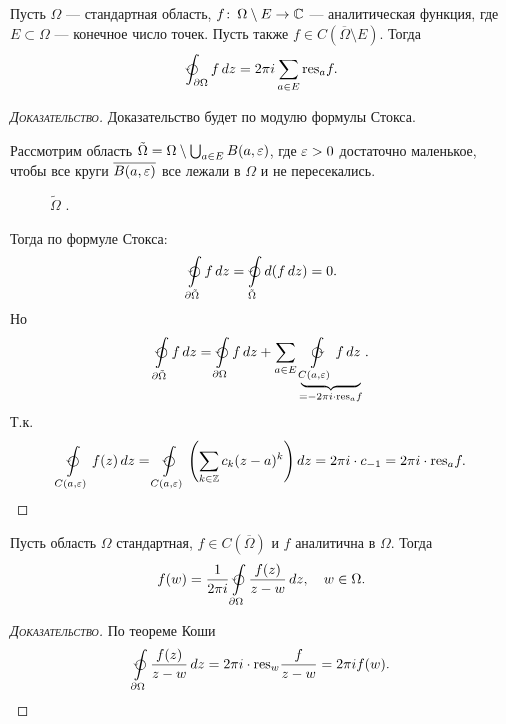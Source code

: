 \documentclass[../complex-analysis.tex]{subfiles}
\begin{document}
\begin{thm}
\label{theorem:cauchy_residue}
Пусть $ \Omega $ --- стандартная область, $ f\colon\,\Omega \setminus E \to \mathbb{C} $ --- аналитическая функция, где $ E \subset \Omega $  --- конечное число точек. Пусть также $ f \in C(\overline{\Omega} \setminus E) $. Тогда
\begin{align*}
 \varointctrclockwise_{\partial \Omega} f\,dz = 2\pi i \sum_{a \in E} \res_{a} f.
\end{align*}
\end{thm}
\begin{proof}[\normalfont\textsc{Доказательство}]
 Доказательство будет по модулю формулы Стокса. 

 Рассмотрим область $ \tilde \Omega = \Omega \setminus \bigcup_{a \in E} B(a,\varepsilon) $, где $ \varepsilon > 0 $ достаточно маленькое, чтобы все круги $ \overline {B(a,\varepsilon)} $ все лежали в $ \Omega $ и не пересекались.

\begin{figure}[ht]
    \centering
    \caption{$\tilde \Omega$ .}
    \label{fig:theorem_cauchy_omega_tilde}
\end{figure}

 Тогда по формуле Стокса:
 \begin{align*}
  \varointctrclockwise \limits_{\partial \tilde \Omega}   f\,dz = \varointctrclockwise\limits_{\tilde \Omega} d(f\,dz) = 0.
 \end{align*} Но
 \begin{align*}
  \varointctrclockwise\limits_{\partial \tilde \Omega} f\,dz = \varointctrclockwise\limits_{\partial \Omega} f\,dz + \sum_{a \in E} \underbrace{\varointclockwise\limits_{C(a,\eps)}f\,dz}_{=-2\pi i \cdot \res_a f}.
 \end{align*} Т.к.
 \begin{align*}
  \varointctrclockwise\limits_{C(a,\eps)}f(z)\,dz = \varointctrclockwise\limits_{C(a,\eps)} \left( \sum_{k \in \Z} c_k(z-a)^{k} \right)dz = 2\pi i \cdot c_{-1} = 2\pi i \cdot \res_a f.
 \end{align*}
\end{proof}

\begin{crly}
 Пусть область $ \Omega $ стандартная, $ f \in C(\overline \Omega) $ и $ f $ аналитична в $ \Omega $. Тогда
 \begin{align*}
  f(w) = \frac{1}{2\pi i} \varointctrclockwise\limits_{\partial\Omega} \frac{f(z)}{z-w}\,dz,\quad w \in \Omega.
 \end{align*}
\end{crly}
\begin{proof}[\normalfont\textsc{Доказательство}]
 По теореме Коши
 \begin{align*}
  \varointctrclockwise\limits_{\partial \Omega} \frac{f(z)}{z-w}\,dz = 2\pi i \cdot \res_w \frac{f}{z-w} = 2\pi i f(w).
 \end{align*}
\end{proof}
\end{document}
